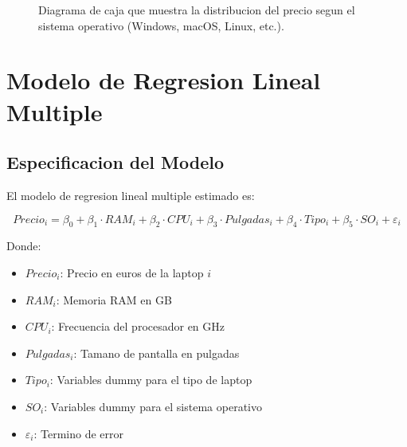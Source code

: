 \documentclass[12pt,a4paper]{article}
\begin{document}
\begin{figure}[H]
    \centering
    \caption{Diagrama de caja que muestra la distribucion del precio segun el sistema operativo (Windows, macOS, Linux, etc.).}
    \label{fig:opsys}
\end{figure}

\section{Modelo de Regresion Lineal Multiple}

\subsection{Especificacion del Modelo}

El modelo de regresion lineal multiple estimado es:

\begin{equation}
    Precio_i = \beta_0 + \beta_1 \cdot RAM_i + \beta_2 \cdot CPU_i + \beta_3 \cdot Pulgadas_i + \beta_4 \cdot Tipo_i + \beta_5 \cdot SO_i + \varepsilon_i
\end{equation}

Donde:
\begin{itemize}
    \item $Precio_i$: Precio en euros de la laptop $i$
    \item $RAM_i$: Memoria RAM en GB
    \item $CPU_i$: Frecuencia del procesador en GHz
    \item $Pulgadas_i$: Tamano de pantalla en pulgadas
    \item $Tipo_i$: Variables dummy para el tipo de laptop
    \item $SO_i$: Variables dummy para el sistema operativo
    \item $\varepsilon_i$: Termino de error
\end{itemize}
\end{document}
